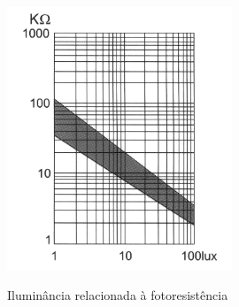 \documentclass[oneside,openright,12pt]{ufsm_2015} %
\begin{document}
\begin{figure}[ht]
    \caption{\label{exepretex} Iluminância relacionada à fotoresistência}
    \centering
    \includegraphics[width=0.6\textwidth]{figuras/ldrgraph.png}
    \vspace{\baselineskip} %
        \label{fig:ldr-graph}
\end{figure}
\end{document}
